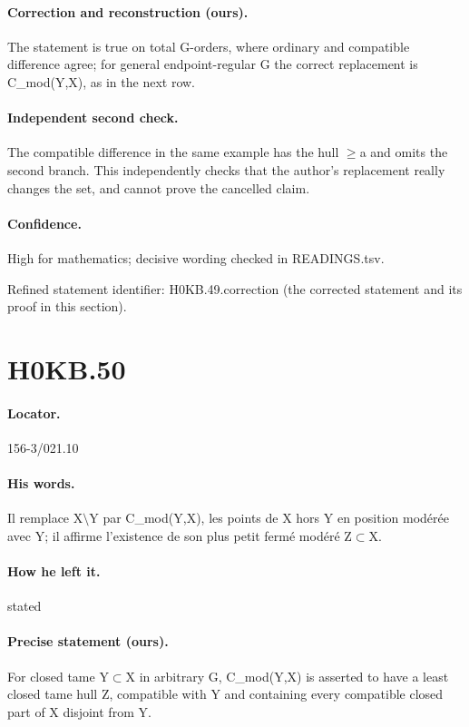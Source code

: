 \paragraph{Correction and reconstruction (ours).} The statement is true on total G-orders, where ordinary and compatible difference agree; for general endpoint-regular G the correct replacement is C\_mod(Y,X), as in the next row.

\paragraph{Independent second check.} The compatible difference in the same example has the hull \ensuremath{\geq}a and omits the second branch. This independently checks that the author’s replacement really changes the set, and cannot prove the cancelled claim.

\paragraph{Confidence.} High for mathematics; decisive wording checked in READINGS.tsv.

\noindent Refined statement identifier: H0KB.49.correction (the corrected statement and its proof in this section).

\section*{H0KB.50}\label{statement:H0KB.50}
\paragraph{Locator.} 156-3/021.10

\paragraph{His words.} Il remplace X\ensuremath{\setminus}Y par C\_mod(Y,X), les points de X hors Y en position modérée avec Y; il affirme l’existence de son plus petit fermé modéré Z\ensuremath{\subset}X.

\paragraph{How he left it.} stated

\paragraph{Precise statement (ours).} For closed tame Y\ensuremath{\subset}X in arbitrary G, C\_mod(Y,X) is asserted to have a least closed tame hull Z, compatible with Y and containing every compatible closed part of X disjoint from Y.

